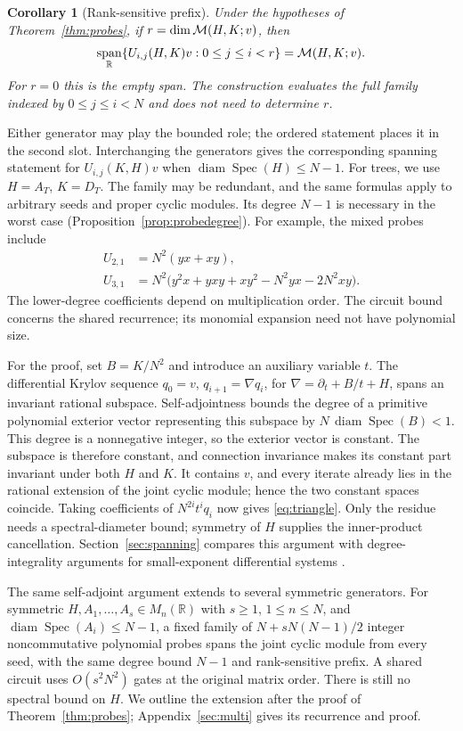 \documentclass[11pt,letterpaper]{article}
\newtheorem{corollary}[theorem]{Corollary}
\theoremstyle{definition}\newtheorem{definition}[theorem]{Definition}
\theoremstyle{remark}\newtheorem{remark}[theorem]{Remark}
\DeclareMathOperator{\spanop}{span}\DeclareMathOperator{\im}{im}
\DeclareMathOperator{\diam}{diam}\DeclareMathOperator{\Spec}{Spec}
\newcommand{\R}{\mathbb R}\newcommand{\Q}{\mathbb Q}\newcommand{\Z}{\mathbb Z}
\begin{document}
\begin{corollary}[Rank-sensitive prefix]\label{cor:rankprefix}
Under the hypotheses of Theorem~\ref{thm:probes}, if $r=\dim\mathcal M(H,K;v)$, then
\[
\spanop_{\R}\{U_{i,j}(H,K)v:0\le j\le i<r\}
=\M(H,K;v).
\]
For $r=0$ this is the empty span. The construction evaluates the full family indexed by $0\le j\le i<N$ and does not need to determine $r$.
\end{corollary}

Either generator may play the bounded role; the ordered statement places it in the second slot. Interchanging the generators gives the corresponding spanning statement for $U_{i,j}(K,H)v$ when $\diam\Spec(H)\le N-1$. For trees, we use $H=A_T$, $K=D_T$. The family may be redundant, and the same formulas apply to arbitrary seeds and proper cyclic modules. Its degree $N-1$ is necessary in the worst case (Proposition~\ref{prop:probedegree}). For example, the mixed probes include
\[
\begin{aligned}
U_{2,1}&=N^2(yx+xy),\\
U_{3,1}&=N^2\bigl(y^2x+yxy+xy^2-N^2yx-2N^2xy\bigr).
\end{aligned}
\]
The lower-degree coefficients depend on multiplication order. The circuit bound concerns the shared recurrence; its monomial expansion need not have polynomial size.

For the proof, set $B=K/N^2$ and introduce an auxiliary variable $t$. The differential Krylov sequence $q_0=v$, $q_{i+1}=\nabla q_i$, for $\nabla=\partial_t+B/t+H$, spans an invariant rational subspace. Self-adjointness bounds the degree of a primitive polynomial exterior vector representing this subspace by $N\,\diam\Spec(B)<1$. This degree is a nonnegative integer, so the exterior vector is constant. The subspace is therefore constant, and connection invariance makes its constant part invariant under both $H$ and $K$. It contains $v$, and every iterate already lies in the rational extension of the joint cyclic module; hence the two constant spaces coincide. Taking coefficients of $N^{2i}t^iq_i$ now gives \eqref{eq:triangle}. Only the residue needs a spectral-diameter bound; symmetry of $H$ supplies the inner-product cancellation. Section~\ref{sec:spanning} compares this argument with degree-integrality arguments for small-exponent differential systems \cite{GV,BG}.

The same self-adjoint argument extends to several symmetric generators.
For symmetric $H,A_1,\ldots,A_s\in M_n(\R)$ with $s\ge1$, $1\le n\le N$, and
$\diam\Spec(A_i)\le N-1$, a fixed family of
$N+sN(N-1)/2$ integer noncommutative polynomial probes spans the joint cyclic module
from every seed, with the same degree bound $N-1$ and rank-sensitive prefix.
A shared circuit uses $O(s^2N^2)$ gates at the original matrix order.
There is still no spectral bound on $H$. We outline the extension after
the proof of Theorem~\ref{thm:probes}; Appendix~\ref{sec:multi} gives its
recurrence and proof.
\end{document}

